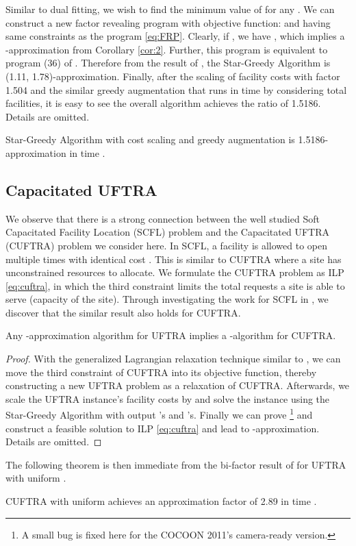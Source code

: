 \documentclass[10pt]{llncs}
\begin{document}
Similar to dual fitting, we wish to find the minimum value of 
for any . We can construct a new factor revealing
program with objective function: 
and having same constraints as the program \eqref{eq:FRP}. Clearly,
if , we have
,
which implies a -approximation
from Corollary \ref{cor:2}. Further, this program is equivalent to
program (36) of \cite{Jain03dualfitting}. Therefore from the result
of \cite{Mahdian021.52}, the Star-Greedy Algorithm is (1.11, 1.78)-approximation.
Finally, after the scaling of facility costs with factor 1.504 and
the similar greedy augmentation that runs in time 
by considering total  facilities, it is easy
to see the overall algorithm achieves the ratio of 1.5186. Details
are omitted.
\begin{theorem}
Star-Greedy Algorithm with cost scaling and greedy augmentation is
1.5186-approximation in time .
\end{theorem}

\subsection{Capacitated UFTRA }

We observe that there is a strong connection between the well studied
Soft Capacitated Facility Location (SCFL) problem \cite{Shmoys97FL,jain01approximation,Mahdian021.52}
and the Capacitated UFTRA (CUFTRA) problem we consider here. In SCFL,
a facility  is allowed to open multiple times with identical cost
. This is similar to CUFTRA where a site has unconstrained
resources to allocate. We formulate the CUFTRA problem as ILP \eqref{eq:cuftra},
in which the third constraint limits the total requests a site is
able to serve (capacity of the site). Through investigating the work
for SCFL in \cite{Mahdian021.52}, we discover that the similar result
also holds for CUFTRA.

{\small 
}{\small \par}
\begin{theorem}
Any -approximation algorithm for
UFTRA implies a -algorithm for CUFTRA.\end{theorem}
\begin{proof}
With the generalized Lagrangian relaxation technique similar to \cite{Mahdian021.52},
we can move the third constraint of CUFTRA into its objective function,
thereby constructing a new UFTRA problem as a relaxation of CUFTRA.
Afterwards, we scale the UFTRA instance's facility costs by 
and solve the instance using the Star-Greedy Algorithm with output
's and 's. Finally we can prove \footnote{A small bug is fixed here for the COCOON 2011's camera-ready version.} and  construct a feasible solution to ILP \eqref{eq:cuftra}
and lead to -approximation. Details
are omitted.
\end{proof}
The following theorem is then immediate from the bi-factor result
of  for UFTRA with uniform .
\begin{theorem}
CUFTRA with uniform  achieves an approximation factor
of 2.89 in time .
\end{theorem}
\end{document}
